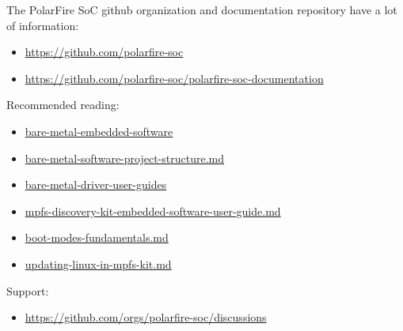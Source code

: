 The PolarFire SoC github organization and documentation repository have a
lot of information:
%
\begin{itemize}
\item
\href{https://github.com/polarfire-soc}
{https://github.com/polarfire-soc}
\item
\href{https://github.com/polarfire-soc/polarfire-soc-documentation}
{https://github.com/polarfire-soc/polarfire-soc-documentation}
\end{itemize}
%
Recommended reading:
%
\begin{itemize}
\item
\href{https://github.com/polarfire-soc/polarfire-soc-documentation/tree/master/bare-metal-embedded-software}
{bare-metal-embedded-software}
\item
\href{https://github.com/polarfire-soc/polarfire-soc-documentation/blob/master/bare-metal-embedded-software/bare-metal-software-project-structure.md}
{bare-metal-software-project-structure.md}
\item
\href{https://github.com/polarfire-soc/polarfire-soc-documentation/blob/master/bare-metal-embedded-software/bare-metal-driver-user-guides}
{bare-metal-driver-user-guides}
\item
\href{https://github.com/polarfire-soc/polarfire-soc-documentation/blob/master/reference-designs-fpga-and-development-kits/mpfs-discovery-kit-embedded-software-user-guide.md}
{mpfs-discovery-kit-embedded-software-user-guide.md}
\item
\href{https://github.com/polarfire-soc/polarfire-soc-documentation/blob/master/knowledge-base/boot-modes/boot-modes-fundamentals.md}
{boot-modes-fundamentals.md}
\item
\href{https://github.com/polarfire-soc/polarfire-soc-documentation/blob/master/reference-designs-fpga-and-development-kits/updating-linux-in-mpfs-kit.md}
{updating-linux-in-mpfs-kit.md}
\end{itemize}
%
Support:
%
\begin{itemize}
\item
\href{https://github.com/orgs/polarfire-soc/discussions}
{https://github.com/orgs/polarfire-soc/discussions}
\end{itemize}

